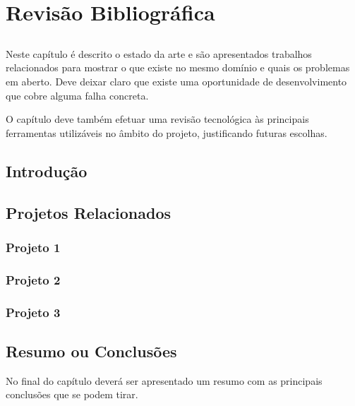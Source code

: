 
\chapter{Revisão Bibliográfica} \label{chap:sota}

\section*{}

Neste capítulo é descrito o estado da arte e são
apresentados trabalhos relacionados para mostrar o que existe no
mesmo domínio e quais os problemas em aberto.
Deve deixar claro que existe uma oportunidade de desenvolvimento que
cobre alguma falha concreta.

O capítulo deve também efetuar uma revisão tecnológica às principais
ferramentas utilizáveis no âmbito do projeto, justificando futuras
escolhas.

\section{Introdução}

\lipsum

\section{Projetos Relacionados} %
\label{sec:projetos_relacionados}

\lipsum[2]

\subsection{Projeto 1} %
\label{sub:projeto_1}

\lipsum


\subsection{Projeto 2} %
\label{sub:projeto_2}

\lipsum


\subsection{Projeto 3} %
\label{sub:projeto_3}

\lipsum




\section{Resumo ou Conclusões}

No final do capítulo deverá ser apresentado um resumo com as 
principais conclusões que se podem tirar. 

\lipsum